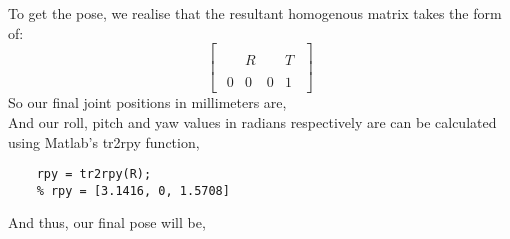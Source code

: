 To get the pose, we realise that the resultant homogenous matrix takes the form of:
\begin{equation*}
    \begin{bmatrix}
        {\begin{array}{ccc|c}&&&\\&R&&T\\&&&\\\hline 0&0&0&1\end{array}}
    \end{bmatrix}
\end{equation*}
So our final joint positions in millimeters are,
\begin{equation*}
    [-588.5342, -133.3000, 371.9096]
\end{equation*}
And our roll, pitch and yaw values in radians respectively are can be calculated using Matlab's tr2rpy function,
\begin{center}
    \begin{lstlisting}
    rpy = tr2rpy(R);
    % rpy = [3.1416, 0, 1.5708]
    \end{lstlisting}
\end{center}
And thus, our final pose will be,
\begin{equation*}
    [-588.5342, -133.3000, 371.9096, 3.1416, 0, 1.5708]
\end{equation*}
